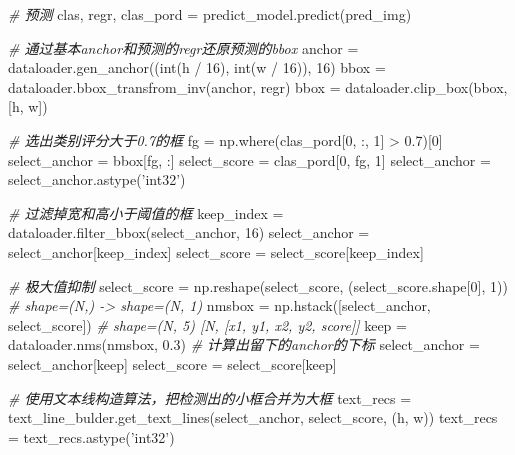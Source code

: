 \documentclass[11pt]{article}
\newenvironment{Shaded}{}{}
\newcommand{\DecValTok}[1]{\textcolor[rgb]{0.25,0.63,0.44}{{#1}}}
\newcommand{\FloatTok}[1]{\textcolor[rgb]{0.25,0.63,0.44}{{#1}}}
\newcommand{\StringTok}[1]{\textcolor[rgb]{0.25,0.44,0.63}{{#1}}}
\newcommand{\CommentTok}[1]{\textcolor[rgb]{0.38,0.63,0.69}{\textit{{#1}}}}
\newcommand{\NormalTok}[1]{{#1}}
\newcommand{\OperatorTok}[1]{\textcolor[rgb]{0.40,0.40,0.40}{{#1}}}
\newcommand{\BuiltInTok}[1]{{#1}}
\begin{document}
\begin{Shaded}
\begin{Highlighting}[]
\CommentTok{# 预测}
\NormalTok{clas, regr, clas_pord }\OperatorTok{=}\NormalTok{ predict_model.predict(pred_img)}

\CommentTok{# 通过基本anchor和预测的regr还原预测的bbox}
\NormalTok{anchor }\OperatorTok{=}\NormalTok{ dataloader.gen_anchor((}\BuiltInTok{int}\NormalTok{(h }\OperatorTok{/} \DecValTok{16}\NormalTok{), }\BuiltInTok{int}\NormalTok{(w }\OperatorTok{/} \DecValTok{16}\NormalTok{)), }\DecValTok{16}\NormalTok{)}
\NormalTok{bbox }\OperatorTok{=}\NormalTok{ dataloader.bbox_transfrom_inv(anchor, regr)}
\NormalTok{bbox }\OperatorTok{=}\NormalTok{ dataloader.clip_box(bbox, [h, w])}

\CommentTok{# 选出类别评分大于0.7的框}
\NormalTok{fg }\OperatorTok{=}\NormalTok{ np.where(clas_pord[}\DecValTok{0}\NormalTok{, :, }\DecValTok{1}\NormalTok{] }\OperatorTok{>} \FloatTok{0.7}\NormalTok{)[}\DecValTok{0}\NormalTok{]}
\NormalTok{select_anchor }\OperatorTok{=}\NormalTok{ bbox[fg, :]}
\NormalTok{select_score }\OperatorTok{=}\NormalTok{ clas_pord[}\DecValTok{0}\NormalTok{, fg, }\DecValTok{1}\NormalTok{]}
\NormalTok{select_anchor }\OperatorTok{=}\NormalTok{ select_anchor.astype(}\StringTok{'int32'}\NormalTok{)}

\CommentTok{# 过滤掉宽和高小于阈值的框}
\NormalTok{keep_index }\OperatorTok{=}\NormalTok{ dataloader.filter_bbox(select_anchor, }\DecValTok{16}\NormalTok{)}
\NormalTok{select_anchor }\OperatorTok{=}\NormalTok{ select_anchor[keep_index]}
\NormalTok{select_score  }\OperatorTok{=}\NormalTok{ select_score[keep_index]}

\CommentTok{# 极大值抑制}
\NormalTok{select_score }\OperatorTok{=}\NormalTok{ np.reshape(select_score, (select_score.shape[}\DecValTok{0}\NormalTok{], }\DecValTok{1}\NormalTok{)) }\CommentTok{# shape=(N,) -> shape=(N, 1)}
\NormalTok{nmsbox }\OperatorTok{=}\NormalTok{ np.hstack([select_anchor, select_score]) }\CommentTok{# shape=(N, 5) [N, [x1, y1, x2, y2, score]]}
\NormalTok{keep }\OperatorTok{=}\NormalTok{ dataloader.nms(nmsbox, }\FloatTok{0.3}\NormalTok{) }\CommentTok{# 计算出留下的anchor的下标}
\NormalTok{select_anchor }\OperatorTok{=}\NormalTok{ select_anchor[keep]}
\NormalTok{select_score  }\OperatorTok{=}\NormalTok{ select_score[keep]}

\CommentTok{# 使用文本线构造算法，把检测出的小框合并为大框}
\NormalTok{text_recs }\OperatorTok{=}\NormalTok{ text_line_bulder.get_text_lines(select_anchor, select_score, (h, w))}
\NormalTok{text_recs }\OperatorTok{=}\NormalTok{ text_recs.astype(}\StringTok{'int32'}\NormalTok{)}


\end{Highlighting}
\end{Shaded}
\end{document}
